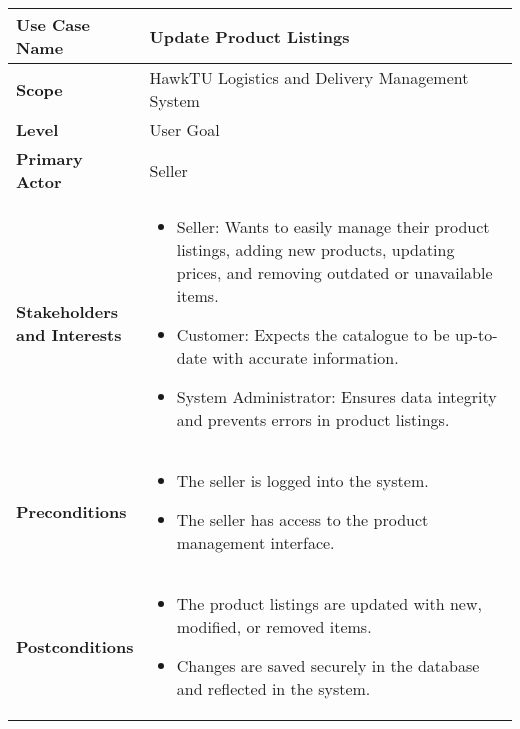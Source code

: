 \documentclass{article}
\begin{document}
\begin{longtable}{|>{\raggedright\arraybackslash}m{0.25\linewidth}|m{0.75\linewidth}|}
\hline
\textbf{Use Case Name} & Update Product Listings \\
\hline
\textbf{Scope} & HawkTU Logistics and Delivery Management System \\
\hline
\textbf{Level} & User Goal \\
\hline
\textbf{Primary Actor} & Seller \\
\hline
\textbf{Stakeholders and Interests} & 
\begin{itemize}
    \item Seller: Wants to easily manage their product listings, adding new products, updating prices, and removing outdated or unavailable items.
    \item Customer: Expects the catalogue to be up-to-date with accurate information.
    \item System Administrator: Ensures data integrity and prevents errors in product listings.
\end{itemize} \\
\hline
\textbf{Preconditions} & 
\begin{itemize}
    \item The seller is logged into the system.
    \item The seller has access to the product management interface.
\end{itemize} \\
\hline
\textbf{Postconditions} & 
\begin{itemize}
    \item The product listings are updated with new, modified, or removed items.
    \item Changes are saved securely in the database and reflected in the system.
\end{itemize} \\
\hline
\end{longtable}

\vspace{-2.45em}
\end{document}
